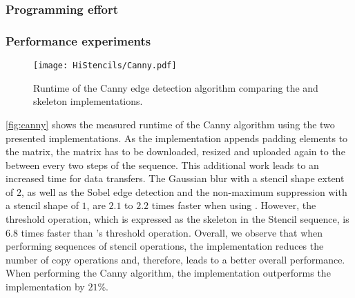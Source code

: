 \subsubsection*{Programming effort}

\subsubsection*{Performance experiments}

\begin{figure}[tbp]
	\centering
	\texttt{[image: HiStencils/Canny.pdf]}
	\caption{Runtime of the Canny edge detection algorithm comparing the  and  skeleton implementations.}
	\label{fig:canny}
\end{figure} 

\autoref{fig:canny} shows the measured runtime of the Canny algorithm using the two presented implementations.
As the  implementation appends padding elements to the matrix, the matrix has to be downloaded, resized and uploaded again to the \GPU between every two steps of the sequence.
This additional work leads to an increased time for data transfers. 
The Gaussian blur with a stencil shape extent of $2$, as well as the Sobel edge detection and the non-maximum suppression with a stencil shape of $1$, are $2.1$ to $2.2$ times faster when using . 
However, the threshold operation, which is expressed as the \map skeleton in the Stencil sequence, is $6.8$ times faster than 's threshold operation.
Overall, we observe that when performing sequences of stencil operations, the  implementation reduces the number of copy operations and, therefore, leads to a better overall performance.
When performing the Canny algorithm, the  implementation outperforms the  implementation by $21\%$.

